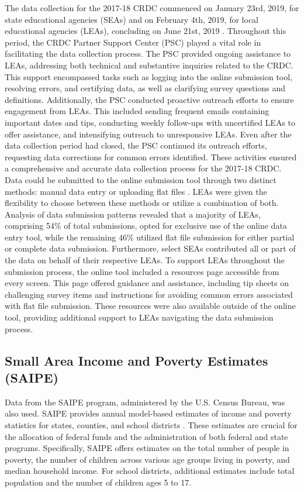 \documentclass[sn-mathphys-num]{sn-jnl}%
\theoremstyle{thmstyleone}%
\theoremstyle{thmstyletwo}%
\theoremstyle{thmstylethree}%
\begin{document}
The data collection for the 2017-18 CRDC commenced on January 23rd, 2019, for state educational agencies (SEAs) and on February 4th, 2019, for local educational agencies (LEAs), concluding on June 21st, 2019 \cite{crdc_manual}. Throughout this period, the CRDC Partner Support Center (PSC) played a vital role in facilitating the data collection process. The PSC provided ongoing assistance to LEAs, addressing both technical and substantive inquiries related to the CRDC. This support encompassed tasks such as logging into the online submission tool, resolving errors, and certifying data, as well as clarifying survey questions and definitions. Additionally, the PSC conducted proactive outreach efforts to ensure engagement from LEAs. This included sending frequent emails containing important dates and tips, conducting weekly follow-ups with uncertified LEAs to offer assistance, and intensifying outreach to unresponsive LEAs. Even after the data collection period had closed, the PSC continued its outreach efforts, requesting data corrections for common errors identified. These activities ensured a comprehensive and accurate data collection process for the 2017-18 CRDC.\\

Data could be submitted to the online submission tool through two distinct methods: manual data entry or uploading flat files \cite{crdc_manual}. LEAs were given the flexibility to choose between these methods or utilize a combination of both. Analysis of data submission patterns revealed that a majority of LEAs, comprising 54$\%$ of total submissions, opted for exclusive use of the online data entry tool, while the remaining 46$\%$ utilized flat file submission for either partial or complete data submission. Furthermore, select SEAs contributed all or part of the data on behalf of their respective LEAs. To support LEAs throughout the submission process, the online tool included a resources page accessible from every screen. This page offered guidance and assistance, including tip sheets on challenging survey items and instructions for avoiding common errors associated with flat file submission. These resources were also available outside of the online tool, providing additional support to LEAs navigating the data submission process.\\

\subsection{Small Area Income and Poverty Estimates (SAIPE)}
Data from the SAIPE program, administered by the U.S. Census Bureau, was also used. SAIPE provides annual model-based estimates of income and poverty statistics for states, counties, and school districts \cite{saipe_about}. These estimates are crucial for the allocation of federal funds and the administration of both federal and state programs. Specifically, SAIPE offers estimates on the total number of people in poverty, the number of children across various age groups living in poverty, and median household income. For school districts, additional estimates include total population and the number of children ages 5 to 17.\\
\end{document}
